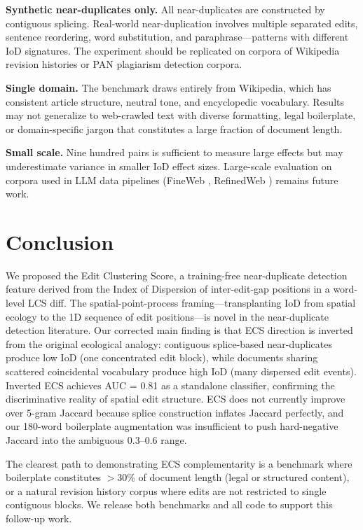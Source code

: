 \documentclass[11pt,letterpaper]{article}
\begin{document}
\noindent\textbf{Synthetic near-duplicates only.} All near-duplicates are constructed by contiguous splicing. Real-world near-duplication involves multiple separated edits, sentence reordering, word substitution, and paraphrase---patterns with different IoD signatures. The experiment should be replicated on corpora of Wikipedia revision histories or PAN plagiarism detection corpora.

\noindent\textbf{Single domain.} The benchmark draws entirely from Wikipedia, which has consistent article structure, neutral tone, and encyclopedic vocabulary. Results may not generalize to web-crawled text with diverse formatting, legal boilerplate, or domain-specific jargon that constitutes a large fraction of document length.

\noindent\textbf{Small scale.} Nine hundred pairs is sufficient to measure large effects but may underestimate variance in smaller IoD effect sizes. Large-scale evaluation on corpora used in LLM data pipelines (FineWeb \citep{Penedo2024}, RefinedWeb \citep{Penedo2023}) remains future work.

\section{Conclusion}

We proposed the Edit Clustering Score, a training-free near-duplicate detection feature derived from the Index of Dispersion of inter-edit-gap positions in a word-level LCS diff. The spatial-point-process framing---transplanting IoD from spatial ecology to the 1D sequence of edit positions---is novel in the near-duplicate detection literature. Our corrected main finding is that ECS direction is inverted from the original ecological analogy: contiguous splice-based near-duplicates produce low IoD (one concentrated edit block), while documents sharing scattered coincidental vocabulary produce high IoD (many dispersed edit events). Inverted ECS achieves AUC = 0.81 as a standalone classifier, confirming the discriminative reality of spatial edit structure. ECS does not currently improve over 5-gram Jaccard because splice construction inflates Jaccard perfectly, and our 180-word boilerplate augmentation was insufficient to push hard-negative Jaccard into the ambiguous 0.3--0.6 range.

The clearest path to demonstrating ECS complementarity is a benchmark where boilerplate constitutes $>$30\% of document length (legal or structured content), or a natural revision history corpus where edits are not restricted to single contiguous blocks. We release both benchmarks and all code to support this follow-up work.



\end{document}
